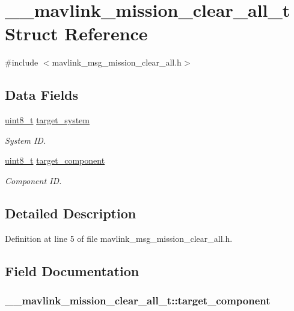 \hypertarget{struct____mavlink__mission__clear__all__t}{\section{\-\_\-\-\_\-mavlink\-\_\-mission\-\_\-clear\-\_\-all\-\_\-t Struct Reference}
\label{struct____mavlink__mission__clear__all__t}
}


{\ttfamily \#include $<$mavlink\-\_\-msg\-\_\-mission\-\_\-clear\-\_\-all.\-h$>$}

\subsection*{Data Fields}
\begin{DoxyCompactItemize}
\item 
\hyperlink{stdint_8h_aba7bc1797add20fe3efdf37ced1182c5}{uint8\-\_\-t} \hyperlink{struct____mavlink__mission__clear__all__t_ad628d39e2e099c3c1c015b15b7d4d150}{target\-\_\-system}
\begin{DoxyCompactList}\small\item\em System I\-D. \end{DoxyCompactList}\item 
\hyperlink{stdint_8h_aba7bc1797add20fe3efdf37ced1182c5}{uint8\-\_\-t} \hyperlink{struct____mavlink__mission__clear__all__t_ac3e8927334773420a64fcd60202651f1}{target\-\_\-component}
\begin{DoxyCompactList}\small\item\em Component I\-D. \end{DoxyCompactList}\end{DoxyCompactItemize}


\subsection{Detailed Description}


Definition at line 5 of file mavlink\-\_\-msg\-\_\-mission\-\_\-clear\-\_\-all.\-h.



\subsection{Field Documentation}
\hypertarget{struct____mavlink__mission__clear__all__t_ac3e8927334773420a64fcd60202651f1}{
\subsubsection[{target\-\_\-component}]{ \-\_\-\-\_\-mavlink\-\_\-mission\-\_\-clear\-\_\-all\-\_\-t\-::target\-\_\-component}}\label{struct____mavlink__mission__clear__all__t_ac3e8927334773420a64fcd60202651f1}


